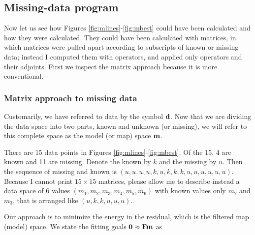\subsection{Missing-data program}
Now let us see how Figures \ref{fig:mlines}-\ref{fig:mbest}
could have been calculated and how they were calculated.
They could have been calculated with matrices,
in which matrices were pulled apart according to subscripts of known
or missing data;
instead I computed them with operators,
and applied only operators and their adjoints.
First we inspect the matrix approach
because it is more conventional.

\subsubsection{Matrix approach to missing data}
\par
Customarily, we have referred to data by the symbol $\bold d$.
Now that we are dividing the data space into two parts,
known and unknown (or missing),
we will refer to this complete space
as the model (or map) space $\bold m$.
\par
There are 15 data points in Figures \ref{fig:mlines}-\ref{fig:mbest}.
Of the 15, 4 are known and 11 are missing.
Denote the known by $k$ and the missing by $u$.
Then the sequence of missing and known
is $(u,u,u,u,k,u,k,k,k,u,u,u,u,u,u)$.
Because I cannot print $15\times 15$ matrices,
please allow me to describe instead a data space of 6 values
$(m_1, m_2, m_3, m_4, m_5, m_6)$ with known values only $m_2$ and $m_3$,
that is arranged like $(u,k,k,u,u,u)$.
\par
Our approach is to minimize the energy in the residual,
which is the filtered map (model) space.
We state the fitting goals
$\bold 0\approx \bold F\bold m$ as
